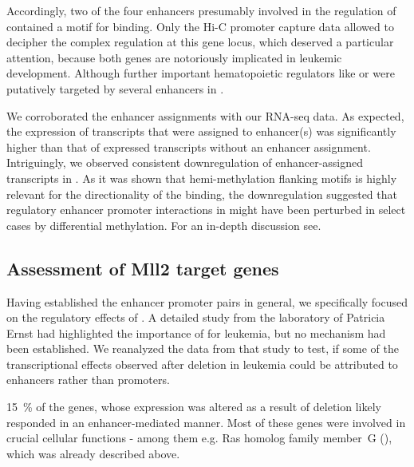 Accordingly, two of the four enhancers presumably involved in the regulation of  contained a motif for  binding. Only the Hi-C promoter capture data allowed to decipher the complex regulation at this gene locus, which deserved a particular attention, because both genes are notoriously implicated in leukemic development\cite{Tybulewicz2005,Jackson2015,Wang2013,Nimmagadda2018}\cite{Nakamura1996,Borrow1996,Zutven2006,Wang2007a,Wang2009,Franks2017}.  Although further important hematopoietic regulators like  or  were putatively targeted by several enhancers in \mllafnine. 

We corroborated the enhancer assignments with our RNA-seq data. As expected, the expression of transcripts that were assigned to enhancer(s) was significantly higher than that of expressed transcripts without an enhancer assignment\supplefig. Intriguingly, we observed consistent downregulation of enhancer-assigned transcripts in \dnmtchip \supplefig. As it was shown that hemi-methylation flanking  motifs is highly relevant for the directionality of the binding\cite{Xu2018b},  the downregulation suggested that regulatory enhancer promoter interactions in \dnmtchip might have been perturbed in select cases by differential methylation. For an in-depth discussion see. 
\FloatBarrier
\subsection{Assessment of Mll2 target genes}
\label{chap:r:enhancers:targets:mlltwotargets}

\fyfrank

Having established the enhancer promoter pairs in general, we specifically focused on the regulatory effects of .  A detailed study from the laboratory of Patricia Ernst had highlighted the importance of  for \mllafnine leukemia\cite{Chen2017a}, but no mechanism had been established. We reanalyzed the data from that study to test, if some of the transcriptional effects observed after  deletion in \mllafnine leukemia could be attributed to enhancers rather than promoters.
 	
\SI{15}{\percent} of the genes, whose expression was altered as a result of  deletion likely responded in an enhancer-mediated manner. Most of these genes were involved in crucial cellular functions - among them e.g. Ras homolog family member~G (), which was already described above. 

